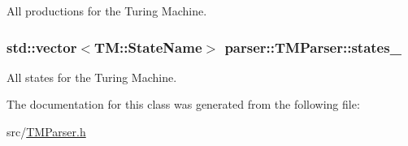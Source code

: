 \-All productions for the \-Turing \-Machine. 

\hypertarget{classparser_1_1TMParser_a8214139fde7f1051bec5c9b786319d1d}{
\subsubsection[{states\-\_\-}]{\setlength{\rightskip}{0pt plus 5cm}std\-::vector$<${\bf \-T\-M\-::\-State\-Name}$>$ {\bf parser\-::\-T\-M\-Parser\-::states\-\_\-}}}\label{d0/d6a/classparser_1_1TMParser_a8214139fde7f1051bec5c9b786319d1d}


\-All states for the \-Turing \-Machine. 



\-The documentation for this class was generated from the following file\-:\begin{DoxyCompactItemize}
\item 
src/\hyperlink{TMParser_8h}{\-T\-M\-Parser.\-h}\end{DoxyCompactItemize}
